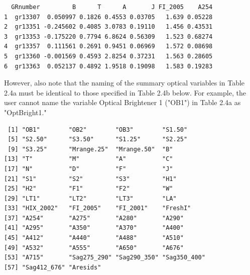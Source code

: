\documentclass[a4paper,11pt]{article}\usepackage[]{graphicx}\usepackage[]{color}
\makeatletter
\newenvironment{kframe}{%
 \def\at@end@of@kframe{}%
 \ifinner\ifhmode%
  \def\at@end@of@kframe{\end{minipage}}%
  \begin{minipage}{\columnwidth}%
 \fi\fi%
 \def\FrameCommand##1{\hskip\@totalleftmargin \hskip-\fboxsep
 \colorbox{shadecolor}{##1}\hskip-\fboxsep
     \hskip-\linewidth \hskip-\@totalleftmargin \hskip\columnwidth}%
 \MakeFramed {\advance\hsize-\width
   \@totalleftmargin\z@ \linewidth\hsize
   \@setminipage}}%
 {\par\unskip\endMakeFramed%
 \at@end@of@kframe}
\newenvironment{knitrout}{}{} %
\makeatother
\begin{document}
\begin{knitrout}
\color{fgcolor}\begin{kframe}
\begin{verbatim}
  GRnumber         B      T      A       J FI_2005    A254
1  gr13307  0.050997 0.1826 0.4553 0.03705   1.639 0.05228
2  gr13351 -0.245602 0.4085 3.0783 0.19110   1.456 0.43531
3  gr13353 -0.175220 0.7794 6.8624 0.56309   1.523 0.68274
4  gr13357  0.111561 0.2691 0.9451 0.06969   1.572 0.08698
5  gr13360 -0.001569 0.4593 2.8254 0.37231   1.563 0.28605
6  gr13363  0.052137 0.4892 1.9518 0.19098   1.583 0.19283
\end{verbatim}
\end{kframe}
\end{knitrout}

However, also note that the naming of the summary optical variables in Table 2.4a must be identical to those specified in Table 2.4b below. For example, the user cannot name the variable Optical Brightener 1 ("OB1") in Table 2.4a as "OptBright1."

\begin{knitrout}
\color{fgcolor}\begin{kframe}
\begin{verbatim}
 [1] "OB1"        "OB2"        "OB3"        "S1.50"     
 [5] "S2.50"      "S3.50"      "S1.25"      "S2.25"     
 [9] "S3.25"      "Mrange.25"  "Mrange.50"  "B"         
[13] "T"          "M"          "A"          "C"         
[17] "N"          "D"          "F"          "J"         
[21] "S1"         "S2"         "S3"         "H1"        
[25] "H2"         "F1"         "F2"         "W"         
[29] "LT1"        "LT2"        "LT3"        "LA"        
[33] "HIX_2002"   "FI_2005"    "FI_2001"    "FreshI"    
[37] "A254"       "A275"       "A280"       "A290"      
[41] "A295"       "A350"       "A370"       "A400"      
[45] "A412"       "A440"       "A488"       "A510"      
[49] "A532"       "A555"       "A650"       "A676"      
[53] "A715"       "Sag275_290" "Sag290_350" "Sag350_400"
[57] "Sag412_676" "Aresids"   
\end{verbatim}
\end{kframe}
\end{knitrout}

\end{document}
